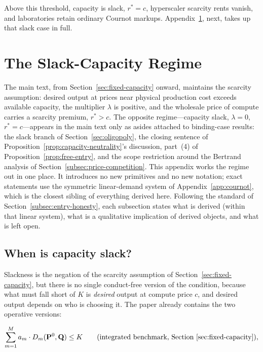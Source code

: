 \documentclass[11pt]{article}
\begin{document}
Above this threshold, capacity is slack, $r^*=c$, hyperscaler scarcity rents vanish, and laboratories retain ordinary Cournot markups. Appendix~\ref{app:slack-capacity}, next, takes up that slack case in full.

\section{The Slack-Capacity Regime}
\label{app:slack-capacity}

The main text, from Section~\ref{sec:fixed-capacity} onward, maintains the scarcity assumption: desired output at prices near physical production cost exceeds available capacity, the multiplier $\lambda$ is positive, and the wholesale price of compute carries a scarcity premium, $r^*>c$. The opposite regime---capacity slack, $\lambda=0$, $r^*=c$---appears in the main text only as asides attached to binding-case results: the slack branch of Section~\ref{sec:oligopoly}, the closing sentence of Proposition~\ref{prop:capacity-neutrality}'s discussion, part~(4) of Proposition~\ref{prop:free-entry}, and the scope restriction around the Bertrand analysis of Section~\ref{subsec:price-competition}. This appendix works the regime out in one place. It introduces no new primitives and no new notation; exact statements use the symmetric linear-demand system of Appendix~\ref{app:cournot}, which is the closest sibling of everything derived here. Following the standard of Section~\ref{subsec:entry-honesty}, each subsection states what is derived (within that linear system), what is a qualitative implication of derived objects, and what is left open.

\subsection{When is capacity slack?}
\label{subsec:slack-condition}

Slackness is the negation of the scarcity assumption of Section~\ref{sec:fixed-capacity}, but there is no single conduct-free version of the condition, because what must fall short of $K$ is \emph{desired} output at compute price $c$, and desired output depends on who is choosing it. The paper already contains the two operative versions:

\begin{equation}\sum_{m=1}^{M}a_m\cdot D_m(\mathbf P^0,\mathbf Q)\leq K\qquad\text{(integrated benchmark, Section~\ref{sec:fixed-capacity})},\end{equation}
\end{document}
